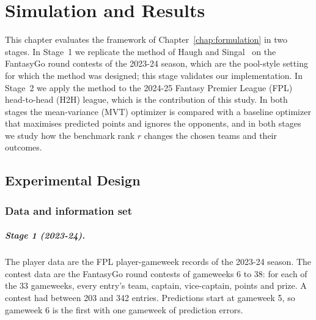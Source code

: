 \documentclass[12pt,oneside,a4paper]{book}
\theoremstyle{definition}
\theoremstyle{remark}
\begin{document}
		\providecommand{\tbd}[1]{\textbf{[TBD: #1]}}



	\providecommand{\tbd}[1]{\textbf{[TBD: #1]}}

	\chapter{Simulation and Results}
	\label{ch:results}

	This chapter evaluates the framework of Chapter~\ref{chap:formulation} in two stages. In Stage~1 we replicate the
	method of Haugh and Singal~\cite{haugh2021play} on the FantasyGo round contests of the 2023-24
	season, which are the pool-style setting for which the method was designed; this stage
	validates our implementation. In Stage~2 we apply the method to the 2024-25 Fantasy Premier
	League (FPL) head-to-head (H2H) league, which is the contribution of this study. In both stages
	the mean-variance (MVT) optimizer is compared with a baseline optimizer that maximises
	predicted points and ignores the opponents, and in both stages we study how the benchmark
	rank $r$ changes the chosen teams and their outcomes.

	\section{Experimental Design}
	\label{sec:design}

	\subsection{Data and information set}
	\label{sec:design-data}

	\paragraph{Stage 1 (2023-24).} The player data are the FPL player-gameweek records of the
	2023-24 season. The contest data are the FantasyGo round contests of gameweeks 6 to 38: for
	each of the 33 gameweeks, every entry's team, captain, vice-captain, points and prize. A contest
	had between 203 and 342 entries. Predictions start at gameweek 5, so gameweek 6 is the first
	with one gameweek of prediction errors.
\end{document}
